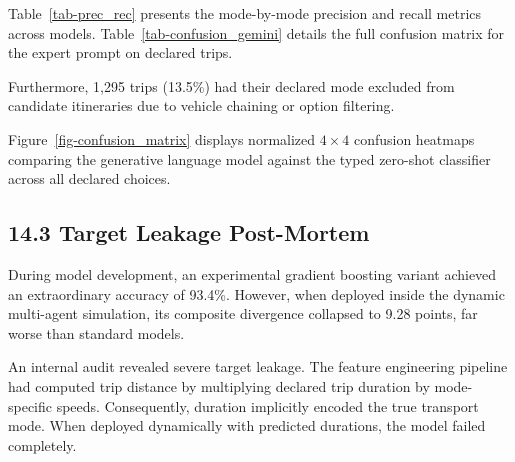 Table~\ref{tab-prec_rec} presents the mode-by-mode precision and recall metrics across models. Table~\ref{tab-confusion_gemini} details the full confusion matrix for the expert prompt on declared trips.

Furthermore, 1,295 trips (13.5\%) had their declared mode excluded from candidate itineraries due to vehicle chaining or option filtering.

Figure~\ref{fig-confusion_matrix} displays normalized $4 \times 4$ confusion heatmaps comparing the generative language model against the typed zero-shot classifier across all declared choices.

\subsection{14.3 Target Leakage Post-Mortem}

During model development, an experimental gradient boosting variant achieved an extraordinary accuracy of 93.4\%. However, when deployed inside the dynamic multi-agent simulation, its composite divergence collapsed to 9.28 points, far worse than standard models.

An internal audit revealed severe target leakage. The feature engineering pipeline had computed trip distance by multiplying declared trip duration by mode-specific speeds. Consequently, duration implicitly encoded the true transport mode. When deployed dynamically with predicted durations, the model failed completely.
